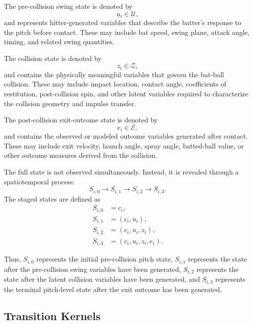 \documentclass[11pt]{article}
\begin{document}
The pre-collision swing state is denoted by
\begin{equation}
u_i \in \mathcal{U},
\end{equation}
and represents hitter-generated variables that describe the batter's response to the pitch before contact. These may include bat speed, swing plane, attack angle, timing, and related swing quantities.

The collision state is denoted by
\begin{equation}
z_i \in \mathcal{Z},
\end{equation}
and contains the physically meaningful variables that govern the bat-ball collision. These may include impact location, contact angle, coefficients of restitution, post-collision spin, and other latent variables required to characterize the collision geometry and impulse transfer.

The post-collision exit-outcome state is denoted by
\begin{equation}
e_i \in \mathcal{E},
\end{equation}
and contains the observed or modeled outcome variables generated after contact. These may include exit velocity, launch angle, spray angle, batted-ball value, or other outcome measures derived from the collision.

The full state is not observed simultaneously. Instead, it is revealed through a spatiotemporal process:
\begin{equation}
S_{i,0}
\longrightarrow
S_{i,1}
\longrightarrow
S_{i,2}
\longrightarrow
S_{i,3}.
\end{equation}
The staged states are defined as
\begin{align}
S_{i,0} &= c_i, \\
S_{i,1} &= (c_i,u_i), \\
S_{i,2} &= (c_i,u_i,z_i), \\
S_{i,3} &= (c_i,u_i,z_i,e_i).
\end{align}


Thus, \(S_{i,0}\) represents the initial pre-collision pitch state, \(S_{i,1}\) represents the state after the pre-collision swing variables have been generated, \(S_{i,2}\) represents the state after the latent collision variables have been generated, and \(S_{i,3}\) represents the terminal pitch-level state after the exit outcome has been generated.

\subsection{Transition Kernels}
\end{document}
